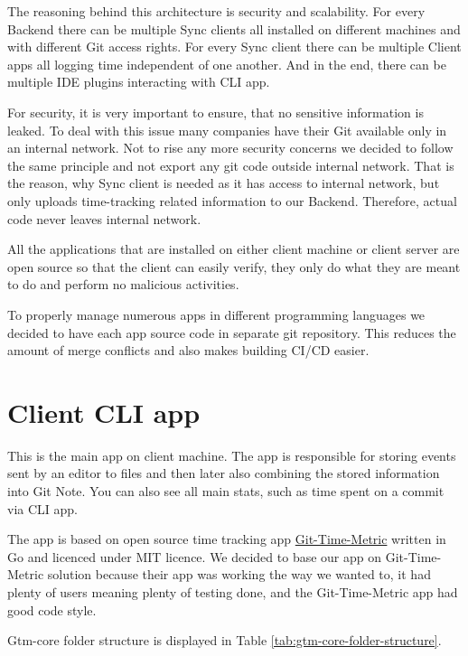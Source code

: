 The reasoning behind this architecture is security and scalability.
For every Backend there can be multiple Sync clients all installed on different machines and with different Git access rights.
For every Sync client there can be multiple Client apps all logging time independent of one another.
And in the end, there can be multiple IDE plugins interacting with CLI app.

For security, it is very important to ensure, that no sensitive information is leaked.
To deal with this issue many companies have their Git available only in an internal network.
Not to rise any more security concerns we decided to follow the same principle and not export any git code outside internal network.
That is the reason, why Sync client is needed as it has access to internal network, but only uploads time-tracking related information to our Backend.
Therefore, actual code never leaves internal network.

All the applications that are installed on either client machine or client server are open source so that the client can easily verify,
they only do what they are meant to do and perform no malicious activities.

To properly manage numerous apps in different programming languages we decided to have each app source code in separate git repository.
This reduces the amount of merge conflicts and also makes building CI/CD easier.


\section{Client CLI app}\label{sec:cli-app}
This is the main app on client machine.
The app is responsible for storing events sent by an editor to files and then later also combining the stored information into Git Note.
You can also see all main stats, such as time spent on a commit via CLI app.

The app is based on open source time tracking app \href{https://github.com/git-time-metric/gtm}{Git-Time-Metric} written in Go and licenced under MIT licence.
We decided to base our app on Git-Time-Metric solution because their app was working the way we wanted to, it had plenty of users meaning plenty of testing done,
and the Git-Time-Metric app had good code style.

Gtm-core folder structure is displayed in Table
\ref{tab:gtm-core-folder-structure}.

